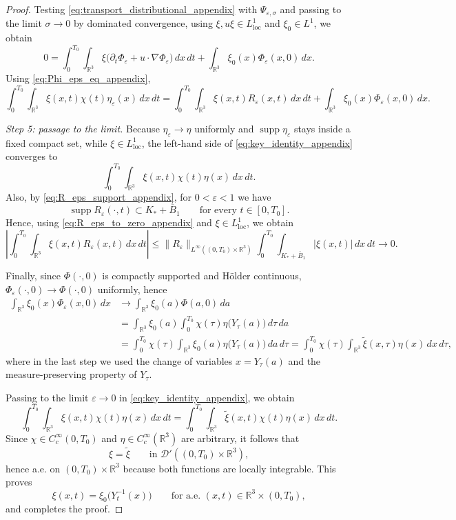 \documentclass[10pt,a4paper]{amsart}
\newcommand{\supp}{\operatorname{supp}}
\begin{document}
\begin{proof}
Testing \eqref{eq:transport_distributional_appendix} with
$\Psi_{\varepsilon,\sigma}$ and passing to the limit $\sigma\to0$ by dominated convergence,
using $\xi,u\xi\in L^1_{\mathrm{loc}}$ and $\xi_0\in L^1$, we obtain
\[
0=
\int_0^{T_0}\int_{\mathbb R^3}
\xi\bigl(\partial_t\Phi_\varepsilon+u\cdot\nabla\Phi_\varepsilon\bigr)\,dx\,dt
+\int_{\mathbb R^3}\xi_0(x)\Phi_\varepsilon(x,0)\,dx .
\]
Using \eqref{eq:Phi_eps_eq_appendix},
\begin{equation}
\label{eq:key_identity_appendix}
\int_0^{T_0}\int_{\mathbb R^3}\xi(x,t)\chi(t)\eta_\varepsilon(x)\,dx\,dt
=
\int_0^{T_0}\int_{\mathbb R^3}\xi(x,t)R_\varepsilon(x,t)\,dx\,dt
+\int_{\mathbb R^3}\xi_0(x)\Phi_\varepsilon(x,0)\,dx .
\end{equation}


\smallskip
\noindent\emph{Step 5: passage to the limit.}
Because $\eta_\varepsilon\to\eta$ uniformly and $\operatorname{supp}\eta_\varepsilon$ stays
inside a fixed compact set, while $\xi\in L^1_{\mathrm{loc}}$, the left-hand side of
\eqref{eq:key_identity_appendix} converges to
\[
\int_0^{T_0}\int_{\mathbb R^3}\xi(x,t)\chi(t)\eta(x)\,dx\,dt.
\]
Also, by \eqref{eq:R_eps_support_appendix}, for $0<\varepsilon<1$ we have
\[
\supp R_\varepsilon(\cdot,t)\subset K_*+\overline B_1
\qquad\text{for every }t\in[0,T_0].
\]
Hence, using \eqref{eq:R_eps_to_zero_appendix} and $\xi\in L^1_{\mathrm{loc}}$, we obtain
\[
\left|
\int_0^{T_0}\int_{\mathbb R^3}\xi(x,t)R_\varepsilon(x,t)\,dx\,dt
\right|
\le
\|R_\varepsilon\|_{L^\infty((0,T_0)\times\mathbb R^3)}
\int_0^{T_0}\int_{K_*+\overline B_1}|\xi(x,t)|\,dx\,dt
\longrightarrow 0.
\]


Finally, since $\Phi(\cdot,0)$ is compactly supported and H\"older continuous,
$\Phi_\varepsilon(\cdot,0)\to\Phi(\cdot,0)$ uniformly, hence
\begin{align*}
\int_{\mathbb R^3}\xi_0(x)\Phi_\varepsilon(x,0)\,dx
&\longrightarrow
\int_{\mathbb R^3}\xi_0(a)\Phi(a,0)\,da \\
&=
\int_{\mathbb R^3}\xi_0(a)\int_0^{T_0}\chi(\tau)\eta\big(Y_\tau(a)\big)\,d\tau\,da \\
&=
\int_0^{T_0}\chi(\tau)\int_{\mathbb R^3}\xi_0(a)\eta\big(Y_\tau(a)\big)\,da\,d\tau 
=
\int_0^{T_0}\chi(\tau)\int_{\mathbb R^3}\widetilde{\xi}(x,\tau)\eta(x)\,dx\,d\tau,
\end{align*}
where in the last step we used the change of variables $x=Y_\tau(a)$ and the
measure-preserving property of $Y_\tau$.

Passing to the limit $\varepsilon\to0$ in \eqref{eq:key_identity_appendix}, we obtain
\[
\int_0^{T_0}\int_{\mathbb R^3}\xi(x,t)\chi(t)\eta(x)\,dx\,dt
=
\int_0^{T_0}\int_{\mathbb R^3}\widetilde{\xi}(x,t)\chi(t)\eta(x)\,dx\,dt.
\]
Since $\chi\in C_c^\infty(0,T_0)$ and $\eta\in C_c^\infty(\mathbb R^3)$ are arbitrary,
it follows that
\[
\xi=\widetilde{\xi}
\qquad\text{in }\mathcal D'((0,T_0)\times\mathbb R^3),
\]
hence a.e. on $(0,T_0)\times\mathbb R^3$ because both functions are locally integrable.
This proves
\[
\xi(x,t)=\xi_0\bigl(Y_t^{-1}(x)\bigr)
\qquad\text{for a.e. }(x,t)\in\mathbb R^3\times(0,T_0),
\]
and completes the proof.
\end{proof}
\end{document}
